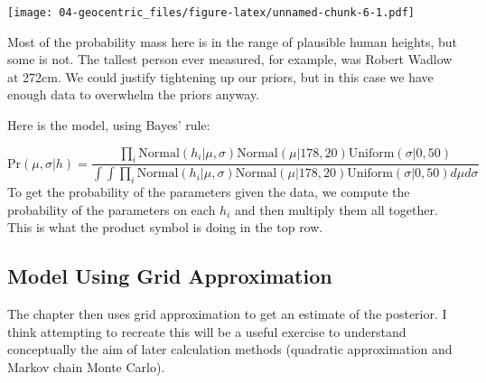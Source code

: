 \documentclass[
]{book}
\begin{document}
\texttt{[image: 04-geocentric\_files/figure-latex/unnamed-chunk-6-1.pdf]}

Most of the probability mass here is in the range of plausible human heights, but some is not. The tallest person ever measured, for example, was Robert Wadlow at 272cm. We could justify tightening up our priors, but in this case we have enough data to overwhelm the priors anyway.

Here is the model, using Bayes' rule:

\[
\text{Pr}(\mu, \sigma | h) = \frac{\prod_i \text{Normal}(h_i | \mu, \sigma) \text{Normal}(\mu | 178, 20) \text{Uniform}(\sigma |0 ,50) }{\int \int \prod_i \text{Normal}(h_i | \mu, \sigma) \text{Normal}(\mu | 178, 20) \text{Uniform}(\sigma |0 ,50) d\mu d\sigma}
\]
To get the probability of the parameters given the data, we compute the probability of the parameters on each \(h_i\) and then multiply them all together. This is what the product symbol is doing in the top row.

\hypertarget{model-using-grid-approximation}{%
\subsection{Model Using Grid Approximation}\label{model-using-grid-approximation}}

The chapter then uses grid approximation to get an estimate of the posterior. I think attempting to recreate this will be a useful exercise to understand conceptually the aim of later calculation methods (quadratic approximation and Markov chain Monte Carlo).
\end{document}
